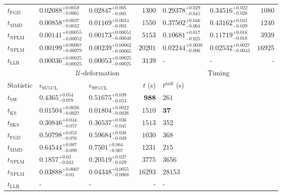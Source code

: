 \begin{tabular}{l|llr|llr}
	$t_{\mathrm{FGD}}$ & $0.02088_{-0.0061}^{+0.0059}$ & $0.02847_{-0.005}^{+0.005}$ & $1300$ & $0.29378_{-0.045}^{+0.029}$ & $0.34516_{-0.026}^{+0.022}$ & $1080$ \\
	$t_{\mathrm{MMD}}$ & $0.00858_{-0.0032}^{+0.0037}$ & $0.01169_{-0.003}^{+0.0034}$ & $1550$ & $0.37502_{-0.064}^{+0.046}$ & $0.43162_{-0.039}^{+0.041}$ & $1240$ \\
\rowcolor{red!35}	$t_{\mathrm{NPLM}}$ & $0.00141_{-0.00052}^{+0.00055}$ & $0.00173_{-0.00048}^{+0.00051}$ & $5153$ & $0.10681_{-0.025}^{+0.017}$ & $0.11719_{-0.018}^{+0.016}$ & $3939$ \\
\rowcolor{blue!35}	$t_{\mathrm{NPLM}}$ & $0.00199_{-0.00079}^{+0.00067}$ & $0.00239_{-0.00065}^{+0.00062}$ & $20201$ & $0.02244_{-0.006}^{+0.0038}$ & $0.02532_{-0.0043}^{+0.0027}$ & $16925$ \\
	$t_{\mathrm{LLR}}$ & $0.00036_{-0.00025}^{+0.00025}$ & $0.00053_{-0.00025}^{+0.00025}$ & $3139$ & - & - & - \\
	\toprule
	\multicolumn{1}{c}{} & \multicolumn{3}{c}{$\mathcal{U}$-deformation} & \multicolumn{3}{c}{Timing} \\
	Statistic & $\epsilon_{95\%\mathrm{CL}}$ & $\epsilon_{99\%\mathrm{CL}}$ & $t$ (s) & $t^{\mathrm{null}}$ (s) \\
	\midrule
	$t_{\mathrm{SW}}$ & $0.4365_{-0.078}^{+0.054}$ & $0.51675_{-0.053}^{+0.039}$ & ${\mathbf{988}}$ & $261$ \\
	$t_{\overline{\mathrm{KS}}}$ & ${\mathbf{0.01504_{-0.0027}^{+0.0026}}}$ & ${\mathbf{0.01804_{-0.0026}^{+0.0022}}}$ & $1510$ & ${\mathbf{37}}$ \\
	$t_{\mathrm{SKS}}$ & $0.30846_{-0.057}^{+0.044}$ & $0.36537_{-0.045}^{+0.036}$ & $1513$ & $352$ \\
	$t_{\mathrm{FGD}}$ & $0.50798_{-0.076}^{+0.053}$ & $0.59684_{-0.049}^{+0.038}$ & $1030$ & $368$ \\
	$t_{\mathrm{MMD}}$ & $0.64544_{-0.099}^{+0.087}$ & $0.7501_{-0.067}^{+0.064}$ & $1231$ & $215$ \\
\rowcolor{red!35}	$t_{\mathrm{NPLM}}$ & $0.1857_{-0.043}^{+0.03}$ & $0.20519_{-0.029}^{+0.027}$ & $3775$ & $3656$ \\
\rowcolor{blue!35}	$t_{\mathrm{NPLM}}$ & $0.03888_{-0.01}^{+0.0067}$ & $0.04348_{-0.0068}^{+0.0055}$ & $16293$ & $28153$ \\
	$t_{\mathrm{LLR}}$ & - & - & - & - \\
	\bottomrule
\end{tabular}